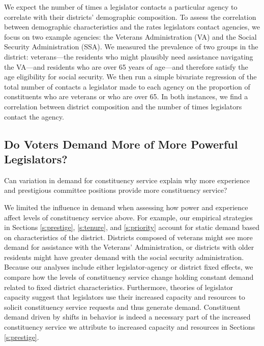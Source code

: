\documentclass[12pt]{article}
\begin{document}
We expect the number of times a legislator contacts a particular agency to correlate with their districts' demographic composition. To assess the correlation between demographic characteristics and the rates legislators contact agencies, we focus on two example agencies: the Veterans Administration (VA) and the Social Security Administration (SSA). We measured the prevalence of two groups in the district: veterans---the residents who might plausibly need assistance navigating the VA---and residents who are over 65 years of age---and therefore satisfy the age eligibility for social security. We then run a simple bivariate regression of the total number of contacts a legislator made to each agency on the proportion of constituents who are veterans or who are over 65.  
In both instances, we find a correlation between district composition and the number of times legislators contact the agency. %

\subsection{Do Voters Demand More of More Powerful Legislators?}

Can variation in demand for constituency service explain why more experience and prestigious committee positions provide more constituency service? 

We limited the influence in demand when assessing how power and experience affect levels of constituency service above. For example, our empirical strategies in Sections \ref{s:prestige}, \ref{s:tenure}, and \ref{s:priority} account for static demand based on characteristics of the district. Districts composed of veterans might see more demand for assistance with the Veterans' Administration, or districts with older residents might have greater demand with the social security administration. Because our analyses include either legislator-agency or district fixed effects, we compare how the levels of constituency service change holding constant demand related to fixed district characteristics. Furthermore, theories of legislator capacity suggest that legislators use their increased capacity and resources to solicit constituency service requests and thus generate demand. Constituent demand driven by shifts in behavior is indeed a necessary part of the increased constituency service we attribute to increased capacity and resources in Sections \ref{s:prestige}.
\end{document}

